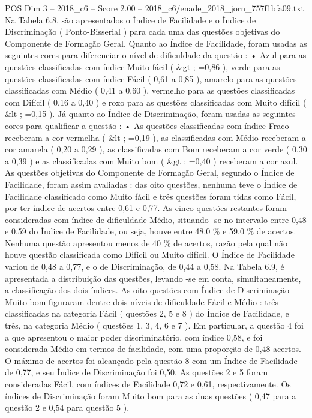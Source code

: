 \begin{textsample}{POS Dim 3 – 2018\_c6 – Score 2.00 – 2018\_c6/enade\_2018\_jorn\_757f1bfa09.txt}
Na Tabela 6.8, são apresentados o Índice de Facilidade e o Índice de Discriminação ( Ponto-Bisserial ) para cada uma das questões objetivas do Componente de Formação Geral.
Quanto ao Índice de Facilidade, foram usadas as seguintes cores para diferenciar o nível de dificuldade da questão : • Azul para as questões classificadas com índice Muito fácil ( \&gt ; =0,86 ), verde para as questões classificadas com índice Fácil ( 0,61 a 0,85 ), amarelo para as questões classificadas com Médio ( 0,41 a 0,60 ), vermelho para as questões classificadas com Difícil ( 0,16 a 0,40 ) e roxo para as questões classificadas com Muito difícil ( \&lt ; =0,15 ).
Já quanto ao Índice de Discriminação, foram usadas as seguintes cores para qualificar a questão : • As questões classificadas com índice Fraco receberam a cor vermelha ( \&lt ; =0,19 ), as classificadas com Médio receberam a cor amarela ( 0,20 a 0,29 ), as classificadas com Bom receberam a cor verde ( 0,30 a 0,39 ) e as classificadas com Muito bom ( \&gt ; =0,40 ) receberam a cor azul.
As questões objetivas do Componente de Formação Geral, segundo o Índice de Facilidade, foram assim avaliadas : das oito questões, nenhuma teve o Índice de Facilidade classificado como Muito fácil e três questões foram tidas como Fácil, por ter índice de acertos entre 0,61 e 0,77.
As cinco questões restantes foram consideradas com índice de dificuldade Médio, situando -se no intervalo entre 0,48 e 0,59 do Índice de Facilidade, ou seja, houve entre 48,0 \% e 59,0 \% de acertos.
Nenhuma questão apresentou menos de 40 \% de acertos, razão pela qual não houve questão classificada como Difícil ou Muito difícil.
O Índice de Facilidade variou de 0,48 a 0,77, e o de Discriminação, de 0,44 a 0,58.
Na Tabela 6.9, é apresentada a distribuição das questões, levando -se em conta, simultaneamente, a classificação dos dois índices.
As oito questões com Índice de Discriminação Muito bom figuraram dentre dois níveis de dificuldade Fácil e Médio : três classificadas na categoria Fácil ( questões 2, 5 e 8 ) do Índice de Facilidade, e três, na categoria Médio ( questões 1, 3, 4, 6 e 7 ).
Em particular, a questão 4 foi a que apresentou o maior poder discriminatório, com índice 0,58, e foi considerada Médio em termos de facilidade, com uma proporção de 0,48 acertos.
O máximo de acertos foi alcançado pela questão 8 com um Índice de Facilidade de 0,77, e seu Índice de Discriminação foi 0,50.
As questões 2 e 5 foram consideradas Fácil, com índices de Facilidade 0,72 e 0,61, respectivamente.
Os índices de Discriminação foram Muito bom para as duas questões ( 0,47 para a questão 2 e 0,54 para questão 5 ).

\end{textsample}
